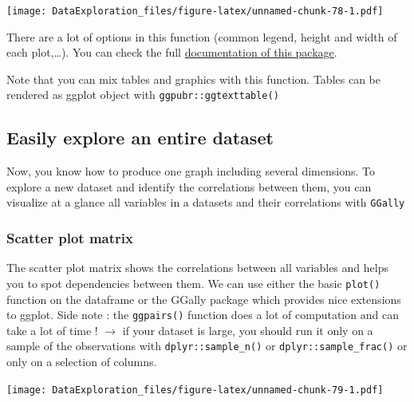 \documentclass[
]{book}
\newenvironment{Shaded}{\begin{snugshade}}{\end{snugshade}}
\newcommand{\KeywordTok}[1]{\textcolor[rgb]{0.13,0.29,0.53}{\textbf{#1}}}
\newcommand{\NormalTok}[1]{#1}
\newcommand{\OperatorTok}[1]{\textcolor[rgb]{0.81,0.36,0.00}{\textbf{#1}}}
\newcommand{\StringTok}[1]{\textcolor[rgb]{0.31,0.60,0.02}{#1}}
\begin{document}
\texttt{[image: DataExploration\_files/figure-latex/unnamed-chunk-78-1.pdf]}

There are a lot of options in this function (common legend, height and width of each plot,\ldots). You can check the full \href{http://www.sthda.com/english/articles/24-ggpubr-publication-ready-plots/}{documentation of this package}.

Note that you can mix tables and graphics with this function. Tables can be rendered as ggplot object with \texttt{ggpubr::ggtexttable()}

\hypertarget{easily-explore-an-entire-dataset}{%
\subsection{Easily explore an entire dataset}\label{easily-explore-an-entire-dataset}}

Now, you know how to produce one graph including several dimensions. To explore a new dataset and identify the correlations between them, you can visualize at a glance all variables in a datasets and their correlations with \texttt{GGally}

\hypertarget{scatter-plot-matrix}{%
\subsubsection{Scatter plot matrix}\label{scatter-plot-matrix}}

The scatter plot matrix shows the correlations between all variables and helps you to spot dependencies between them. We can use either the basic \texttt{plot()} function on the dataframe or the GGally package which provides nice extensions to ggplot.
Side note : the \texttt{ggpairs()} function does a lot of computation and can take a lot of time ! \(\rightarrow\) if your dataset is large, you should run it only on a sample of the observations with \texttt{dplyr::sample\_n()} or \texttt{dplyr::sample\_frac()} or only on a selection of columns.

\begin{Shaded}
\end{Shaded}

\texttt{[image: DataExploration\_files/figure-latex/unnamed-chunk-79-1.pdf]}
\end{document}
